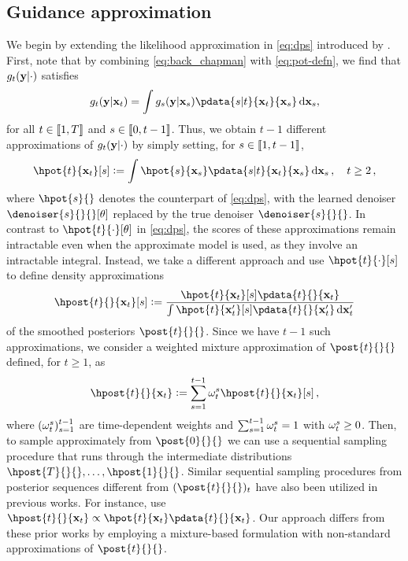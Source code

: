 \subsection{Guidance approximation} 
We begin by extending the likelihood approximation in \eqref{eq:dps} introduced by \citet{ho2022video, chung2023diffusion}. 
First, note that by combining \eqref{eq:back_chapman} with \eqref{eq:pot-defn}, we find that $\pot{t}{}$ satisfies
\[
\pot{t}{\bx_t} = \int \pot{s}{\bx_s} \pdata{s|t}{\bx_t}{\bx_s} \, \rmd \bx_s, 
\]
for all $t\in \llbracket 1, T \rrbracket$ and $s \in \llbracket 0, t-1 \rrbracket$. Thus, we obtain $t-1$ different approximations of $\pot{t}{}$ by simply setting,  for $s \in \llbracket 1, t-1 \rrbracket$,
\begin{equation}
    \label{eq:hpot-def}
\hpot{t}{\bx_t}[s] \eqdef \int \hpot{s}{\bx_s}  \pdata{s|t}{\bx_t}{\bx_s} \, \rmd \bx_s \eqsp, \quad t \geq 2 \eqsp,
\end{equation}
where $\hpot{s}{}$ denotes the counterpart of \eqref{eq:dps}, with the learned denoiser $\denoiser{s}{}{}[\param]$ replaced by the true denoiser $\denoiser{s}{}{}$. 
In contrast to $\hpot{t}{\cdot}[\param]$ in \eqref{eq:dps}, the scores of these approximations remain intractable even when the approximate model is used, as they involve an intractable integral.
Instead, we take a different approach and use $ \hpot{t}{\cdot}[s] $ to define density approximations 
\begin{equation}
    \label{eq:mixture-component}
\hpost{t}{}{\bx_t}[s] \eqdef \frac{\hpot{t}{\bx_t}[s] \pdata{t}{}{\bx_t}}{\int \hpot{t}{\bx^\prime_t}[s] \pdata{t}{}{\bx^\prime_t} \, \rmd \bx^\prime_t} 
\end{equation}
of the smoothed posteriors $\post{t}{}{}$. Since we have $t-1$ such approximations, we consider a weighted mixture approximation of $\post{t}{}{}$ defined, for $t \geq 1$, as 
\begin{equation}
    \label{eq:posterior-approximation}
    \hpost{t}{}{\bx_t}  \eqdef \sum_{s = 1}^{t-1} \wght^s _t \hpost{t}{}{\bx_t}[s] \eqsp, 
\end{equation}
where $(\omega^s _t)_{s = 1} ^{t-1}$ are time-dependent weights and $\sum_{s = 1}^{t-1} \omega^s _t = 1$ with $\omega^s _t \geq 0$. 
Then, to sample approximately from $\post{0}{}{}$ we can use a sequential sampling procedure that runs through the intermediate distributions $\hpost{T}{}{}, \dotsc, \hpost{1}{}{}$. Similar sequential sampling procedures from posterior sequences different from $(\post{t}{}{})_t$ have also been utilized in previous works. For instance, \citet{wu2023practical,rozet2023score} use $\hpost{t}{}{\bx_t} \propto \hpot{t}{\bx_t} \pdata{t}{}{\bx_t}$. Our approach differs from these prior works by employing a mixture-based formulation with non-standard approximations of $\post{t}{}{}$. 
